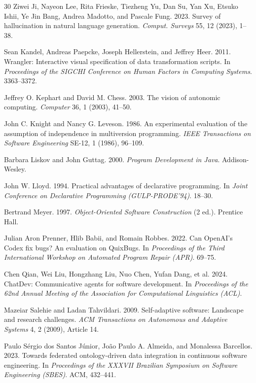 \documentclass[sigconf,nonacm]{acmart}
\begin{document}
\begin{thebibliography}{30}
Ziwei Ji, Nayeon Lee, Rita Frieske, Tiezheng Yu, Dan Su, Yan Xu, Etsuko Ishii, Ye Jin Bang, Andrea Madotto, and Pascale Fung. 2023.
Survey of hallucination in natural language generation.
\textit{Comput. Surveys} 55, 12 (2023), 1--38.

Sean Kandel, Andreas Paepcke, Joseph Hellerstein, and Jeffrey Heer. 2011.
Wrangler: Interactive visual specification of data transformation scripts.
In \textit{Proceedings of the SIGCHI Conference on Human Factors in Computing Systems}. 3363--3372.

Jeffrey O. Kephart and David M. Chess. 2003.
The vision of autonomic computing.
\textit{Computer} 36, 1 (2003), 41--50.

John C. Knight and Nancy G. Leveson. 1986.
An experimental evaluation of the assumption of independence in multiversion programming.
\textit{IEEE Transactions on Software Engineering} SE-12, 1 (1986), 96--109.

Barbara Liskov and John Guttag. 2000.
\textit{Program Development in Java}.
Addison-Wesley.

John W. Lloyd. 1994.
Practical advantages of declarative programming.
In \textit{Joint Conference on Declarative Programming (GULP-PRODE'94)}. 18--30.

Bertrand Meyer. 1997.
\textit{Object-Oriented Software Construction} (2 ed.).
Prentice Hall.

Julian Aron Prenner, Hlib Babii, and Romain Robbes. 2022.
Can OpenAI's Codex fix bugs? An evaluation on QuixBugs.
In \textit{Proceedings of the Third International Workshop on Automated Program Repair (APR)}. 69--75.

Chen Qian, Wei Liu, Hongzhang Liu, Nuo Chen, Yufan Dang, et al. 2024.
ChatDev: Communicative agents for software development.
In \textit{Proceedings of the 62nd Annual Meeting of the Association for Computational Linguistics (ACL)}.

Mazeiar Salehie and Ladan Tahvildari. 2009.
Self-adaptive software: Landscape and research challenges.
\textit{ACM Transactions on Autonomous and Adaptive Systems} 4, 2 (2009), Article 14.

Paulo Sérgio dos Santos Júnior, João Paulo A. Almeida, and Monalessa Barcellos. 2023.
Towards federated ontology-driven data integration in continuous software engineering.
In \textit{Proceedings of the XXXVII Brazilian Symposium on Software Engineering (SBES)}. ACM, 432--441.


\end{thebibliography}
\end{document}
